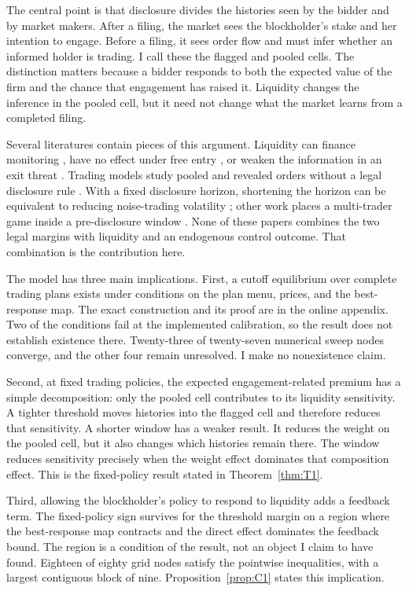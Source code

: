 \documentclass[11pt]{article}
\begin{document}
The central point is that disclosure divides the histories seen by the bidder and by market makers.
After a filing, the market sees the blockholder's stake and her intention to engage. Before a filing,
it sees order flow and must infer whether an informed holder is trading. I call these the flagged and
pooled cells. The distinction matters because a bidder responds to both the expected value of the
firm and the chance that engagement has raised it. Liquidity changes the inference in the pooled cell,
but it need not change what the market learns from a completed filing.

Several literatures contain pieces of this argument. Liquidity can finance monitoring
\citep{Maug1998}, have no effect under free entry \citep{KahnWinton1998}, or weaken the information
in an exit threat \citep{AdmatiPfleiderer2009}. Trading models study pooled and revealed orders
without a legal disclosure rule \citep{KyleVila1991}. With a fixed disclosure horizon, shortening
the horizon can be equivalent to reducing noise-trading volatility \citep{BackEtAl2018}; other work
places a multi-trader game inside a pre-disclosure window \citep{CetemenCisternasKolbViswanathan2026}.
None of these papers combines the two legal margins with liquidity and an endogenous control
outcome. That combination is the contribution here.

The model has three main implications. First, a cutoff equilibrium over complete trading plans exists
under conditions on the plan menu, prices, and the best-response map. The exact construction and its
proof are in the online appendix. Two of the conditions fail at the implemented calibration, so the
result does not establish existence there. Twenty-three of twenty-seven numerical sweep nodes
converge, and the other four remain unresolved. I make no nonexistence claim.

Second, at fixed trading policies, the expected engagement-related premium has a simple decomposition:
only the pooled cell contributes to its liquidity sensitivity. A tighter threshold moves histories
into the flagged cell and therefore reduces that sensitivity. A shorter window has a weaker result.
It reduces the weight on the pooled cell, but it also changes which histories remain there. The window
reduces sensitivity precisely when the weight effect dominates that composition effect. This is the
fixed-policy result stated in Theorem~\ref{thm:T1}.

Third, allowing the blockholder's policy to respond to liquidity adds a feedback term. The fixed-policy
sign survives for the threshold margin on a region where the best-response map contracts and the
direct effect dominates the feedback bound. The region is a condition of the result, not an object I
claim to have found. Eighteen of eighty grid nodes satisfy the pointwise inequalities, with a largest
contiguous block of nine. Proposition~\ref{prop:C1} states this implication.
\end{document}
